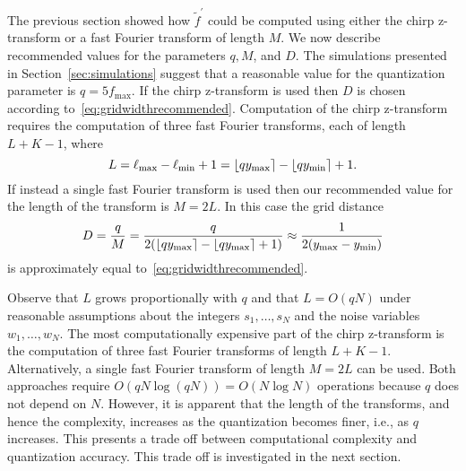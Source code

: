 \documentclass[10pt,twocolumn,twoside]{IEEEtran}
\begin{document}
The previous section showed how $\widetilde{f}^\prime$ could be computed using either the chirp z-transform or a fast Fourier transform of length $M$.  We now describe recommended values for the parameters $q, M$, and $D$.  The simulations presented in Section~\ref{sec:simulations} suggest that a reasonable value for the quantization parameter is $q = 5 f_{\text{max}}$.  If the chirp z-transform is used then $D$ is chosen according to~\eqref{eq:gridwidthrecommended}.  Computation of the chirp z-transform requires the computation of three fast Fourier transforms, each of length $L + K - 1$, where 
\[
L = \ell_{\text{max}} - \ell_{\text{min}} + 1 = {\left\lfloor qy_{\text{max}} \right\rceil} - {\left\lfloor qy_{\text{min}} \right\rceil} + 1.
\]
If instead a single fast Fourier transform is used then our recommended value for the length of the transform is $M= 2L$.  In this case the grid distance
\[ 
D = \frac{q}{M} = \frac{q}{2({\left\lfloor qy_{\text{max}} \right\rceil} - {\left\lfloor qy_{\text{max}} \right\rceil} + 1)} \approx  \frac{1}{2(y_{\text{max}} - y_{\text{min}})}
\]
is approximately equal to~\eqref{eq:gridwidthrecommended}.  

Observe that $L$ grows proportionally with $q$ and that $L = O(qN)$ under reasonable assumptions about the integers $s_1,\dots,s_N$ and the noise variables $w_1,\dots,w_N$.  The most computationally expensive part of the chirp z-transform is the computation of three fast Fourier transforms of length $L+K-1$.  Alternatively, a single fast Fourier transform of length $M = 2L$ can be used.  Both approaches require $O(qN\log(qN)) = O(N\log N)$ operations because $q$ does not depend on $N$.  However, it is apparent that the length of the transforms, and hence the complexity, increases as the quantization becomes finer, i.e., as $q$ increases.  This presents a trade off between computational complexity and quantization accuracy.  This trade off is investigated in the next section.
\end{document}
